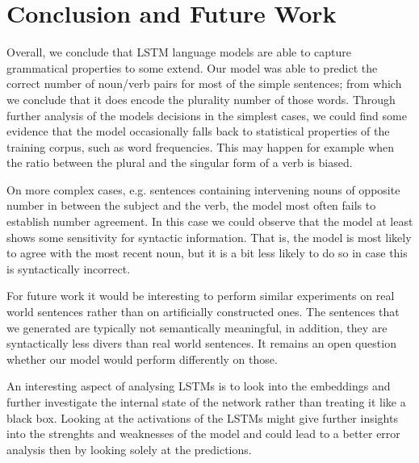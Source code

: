 \documentclass[11pt,a4paper]{article}
\begin{document}
\section{Conclusion and Future Work}
\label{conclusion}


Overall, we conclude that LSTM language models
are able to capture grammatical properties to some extend.
Our model was able to predict the correct number of noun/verb pairs 
for most of the simple sentences;
from which we conclude that it does encode the plurality number of those words. 
Through further analysis of the models decisions in the simplest cases, we could find some evidence that the model occasionally falls back to statistical properties of the training corpus, such as word frequencies.
This may happen for example when the ratio between the plural 
and the singular form of a verb is biased.

On more complex cases, e.g. sentences containing intervening nouns 
of opposite number
in between the subject and the verb, 
the model most often fails to establish number agreement. 
In this case we could observe that the model at least shows 
some sensitivity for syntactic information.
That is, the model is most likely to agree with the
most recent noun, but it is a bit less likely to do so 
in case this is syntactically incorrect.

For future work it would be interesting to perform similar experiments on real world sentences rather than on artificially constructed ones. 
The sentences that we generated are typically not semantically meaningful,
in addition, they are syntactically less divers than real world sentences. 
It remains an open question whether our model would perform differently on those.

An interesting aspect of analysing LSTMs is to look into the embeddings and further investigate the internal state of the network rather than treating it like a black box. Looking at the activations of the LSTMs might give further insights into the strenghts and weaknesses of the model and could lead to a better error analysis then by looking solely at the predictions. 
\end{document}
